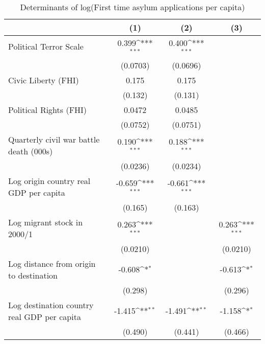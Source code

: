 \begin{table}[htbp]\centering
\def\sym#1{\ifmmode^{#1}\else\(^{#1}\)\fi}
\caption{Determinants of log(First time asylum applications per capita)}
\begin{tabular}{l*{3}{c}}
\hline\hline
                    &\multicolumn{1}{c}{(1)}         &\multicolumn{1}{c}{(2)}         &\multicolumn{1}{c}{(3)}         \\
\hline
Political Terror Scale&       0.399\sym{***}&       0.400\sym{***}&                     \\
                    &    (0.0703)         &    (0.0696)         &                     \\
[1em]
Civic Liberty (FHI) &       0.175         &       0.175         &                     \\
                    &     (0.132)         &     (0.131)         &                     \\
[1em]
Political Rights (FHI)&      0.0472         &      0.0485         &                     \\
                    &    (0.0752)         &    (0.0751)         &                     \\
[1em]
Quarterly civil war battle death (000s)&       0.190\sym{***}&       0.188\sym{***}&                     \\
                    &    (0.0236)         &    (0.0234)         &                     \\
[1em]
Log origin country real GDP per capita&      -0.659\sym{***}&      -0.661\sym{***}&                     \\
                    &     (0.165)         &     (0.163)         &                     \\
[1em]
Log migrant stock in 2000/1&       0.263\sym{***}&                     &       0.263\sym{***}\\
                    &    (0.0210)         &                     &    (0.0210)         \\
[1em]
Log distance from origin to destination&      -0.608\sym{*}  &                     &      -0.613\sym{*}  \\
                    &     (0.298)         &                     &     (0.296)         \\
[1em]
Log destination country real GDP per capita&      -1.415\sym{**} &      -1.491\sym{**} &      -1.158\sym{*}  \\
                    &     (0.490)         &     (0.441)         &     (0.466)         \\

\end{tabular}
\end{table}
